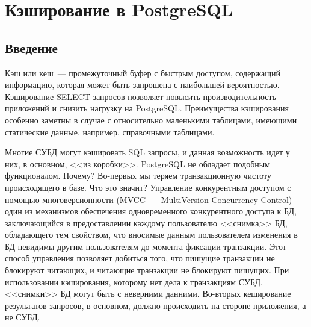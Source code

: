 \chapter{Кэширование в PostgreSQL}
\begin{epigraphs}
\end{epigraphs}
\section{Введение}
Кэш или кеш~--- промежуточный буфер с быстрым доступом, содержащий информацию, которая может быть запрошена с наибольшей вероятностью.
Кэширование SELECT запросов позволяет повысить производительность приложений и снизить нагрузку на PostgreSQL. 
Преимущества кэширования особенно заметны в случае с относительно маленькими таблицами, имеющими статические данные, 
например, справочными таблицами. 

Многие СУБД могут кэшировать SQL запросы, и данная возможность идет у них, в основном, <<из коробки>>. 
PostgreSQL не обладает подобным функционалом. Почему? 
Во-первых мы теряем транзакционную чистоту происходящего в базе. Что это значит?
Управление конкурентным доступом с помощью многоверсионности (MVCC~--- MultiVersion Concurrency Control)~--- 
один из механизмов обеспечения одновременного конкурентного доступа к БД, заключающийся в предоставлении каждому 
пользователю <<снимка>> БД, обладающего тем свойством, что вносимые данным пользователем изменения в БД невидимы 
другим пользователям до момента фиксации транзакции. Этот способ управления позволяет добиться того, что пишущие 
транзакции не блокируют читающих, и читающие транзакции не блокируют пишущих. 
При использовании кэширования, которому нет дела к транзакциям СУБД, <<снимки>> БД могут быть с неверними данними.
Во-вторых кеширование результатов запросов, в основном, должно происходить на стороне приложения, а не СУБД. 
